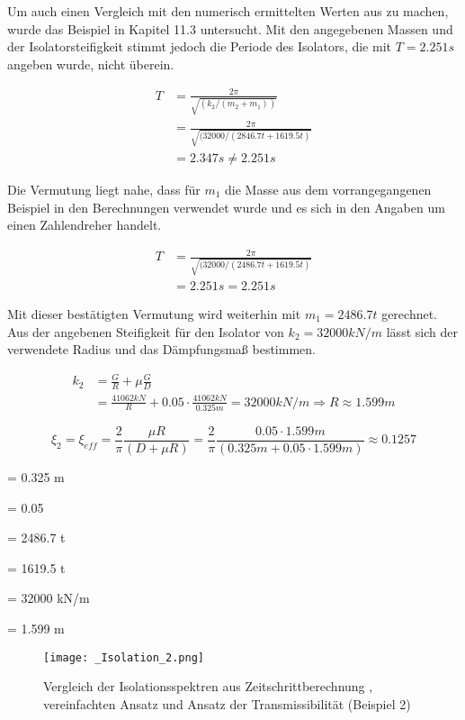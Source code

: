 Um auch einen Vergleich mit den numerisch ermittelten Werten aus \cite{Isemann} zu machen, wurde das Beispiel in Kapitel 11.3 untersucht.
Mit den angegebenen Massen und der Isolatorsteifigkeit stimmt jedoch die Periode des Isolators, die mit $T = 2.251 s$ angeben wurde, nicht überein.

\begin{align*}
T &= \frac{2 \pi}{\sqrt{(k_2/(m_2+m_1))}}\\
  &= \frac{2 \pi}{\sqrt{(32000/( 2846.7 t + 1619.5 t)}}\\
  &= 2.347 s \neq 2.251 s
\end{align*}

Die Vermutung liegt nahe, dass für $m_1$ die Masse aus dem vorrangegangenen Beispiel in den Berechnungen verwendet wurde und es sich in den Angaben um einen \glqq Zahlendreher\grqq{} handelt.

\begin{align*}
T &= \frac{2 \pi}{\sqrt{(32000/( 2486.7 t + 1619.5 t)}}\\
  &= 2.251 s = 2.251 s
\end{align*}

Mit dieser bestätigten Vermutung wird weiterhin mit $m_1 = 2486.7 t$ gerechnet.
Aus der angebenen Steifigkeit für den Isolator von $k_2 = 32000 kN/m$ lässt sich der verwendete Radius und das Dämpfungsmaß bestimmen.

\begin{align*}
k_2 &= \frac{G}{R} + \mu \frac{G}{D}\\
    &= \frac{41062 kN}{R} + 0.05 \cdot \frac{41062 kN}{0.325 m} = 32000 kN/m \Rightarrow R \approx 1.599 m
\end{align*}

\begin{equation*}
\xi_2 = \xi_{eff} = \frac{2}{\pi} \frac{\mu R}{(D + \mu R)} = \frac{2}{\pi} \frac{0.05 \cdot 1.599 m}{(0.325 m + 0.05 \cdot 1.599 m)} \approx 0.1257
\end{equation*} 

    = 0.325 m \par
\makebox[1cm]{$\mu$}  = 0.05\par
{}  = 2486.7 t\par
{}  = 1619.5 t\par
{}  = 32000 kN/m \par
{}    = 1.599 m\par

\begin{figure}[H]
    \centering
    \texttt{[image: \_Isolation\_2.png]}
    \caption{Vergleich der Isolationsspektren aus Zeitschrittberechnung \cite{Isemann}, vereinfachten Ansatz und Ansatz der Transmissibilität (Beispiel 2)}
    \label{fig:Isolation}
\end{figure}

